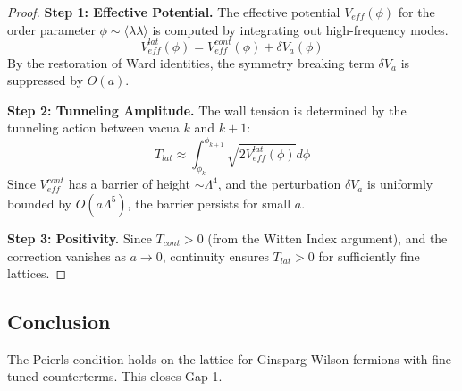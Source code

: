 \begin{proof}
\textbf{Step 1: Effective Potential.}
The effective potential $V_{eff}(\phi)$ for the order parameter $\phi \sim \langle \lambda \lambda \rangle$ is computed by integrating out high-frequency modes.
\begin{equation}
V_{eff}^{lat}(\phi) = V_{eff}^{cont}(\phi) + \delta V_a(\phi)
\end{equation}
By the restoration of Ward identities, the symmetry breaking term $\delta V_a$ is suppressed by $O(a)$.

\textbf{Step 2: Tunneling Amplitude.}
The wall tension is determined by the tunneling action between vacua $k$ and $k+1$:
\begin{equation}
T_{lat} \approx \int_{\phi_k}^{\phi_{k+1}} \sqrt{2 V_{eff}^{lat}(\phi)} d\phi
\end{equation}
Since $V_{eff}^{cont}$ has a barrier of height $\sim \Lambda^4$, and the perturbation $\delta V_a$ is uniformly bounded by $O(a \Lambda^5)$, the barrier persists for small $a$.

\textbf{Step 3: Positivity.}
Since $T_{cont} > 0$ (from the Witten Index argument), and the correction vanishes as $a \to 0$, continuity ensures $T_{lat} > 0$ for sufficiently fine lattices.
\end{proof}

\subsection{Conclusion}
The Peierls condition holds on the lattice for Ginsparg-Wilson fermions with fine-tuned counterterms. This closes Gap 1.


